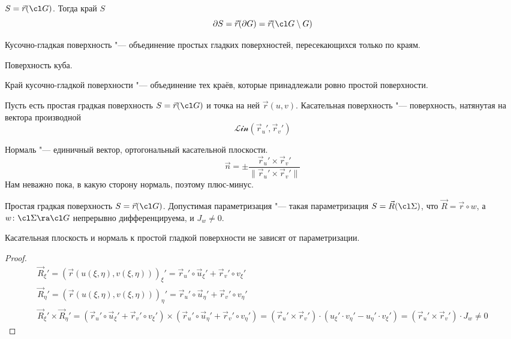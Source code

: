 \begin{Def}
	$S = \vec r(\cl G)$. Тогда край $S$
	\[ \partial S = \vec r(\partial G) = \vec r(\cl G \setminus G) \]
\end{Def}

\begin{Def}
	Кусочно-гладкая поверхность "--- объединение простых гладких поверхностей, пересекающихся только по краям.
\end{Def}

\begin{exmp}
	Поверхность куба.
\end{exmp}

\begin{Def}
	Край кусочно-гладкой поверхности "--- объединение тех краёв, которые принадлежали ровно простой поверхности.
\end{Def}

\begin{Def}
	Пусть есть простая градкая поверхность $S = \vec r(\cl G)$ и точка на ней $\vec r(u, v)$.
	Касательная поверхность "--- поверхность, натянутая на вектора производной
	\[ \mathcal{Lin}(\vec r_u', \vec r_v') \]
\end{Def}

\begin{Def}
	Нормаль "--- единичный вектор, ортогональный касательной плоскости.
	\[ \vec n = \pm\frac{\vec r_u' \times \vec r_v'}{\|\vec r_u' \times \vec r_v'\|} \]
	Нам неважно пока, в какую сторону нормаль, поэтому плюс-минус.
\end{Def}

\begin{Def}
	Простая градкая поверхность $S = \vec r(\cl G)$.
	Допустимая параметризация "--- такая параметризация $S = \vec R(\cl \Sigma)$,
	что $\vec R = \vec r \circ w$, а $w\colon \cl \Sigma \ra \cl G$ непрерывно дифференцируема, и $J_w \ne 0$.
\end{Def}

\begin{theorem}
	Касательная плоскость и нормаль к простой гладкой поверхности не зависят от параметризации.
\end{theorem}
\begin{proof}
	\begin{gather*}
		\vec R_\xi'
		= (\vec r(u(\xi,\eta),v(\xi,\eta)))_\xi'
		= \vec r_u' \circ \vec u_\xi'  + \vec r_v' \circ v_\xi'  \\
		\vec R_\eta'
		= (\vec r(u(\xi,\eta),v(\xi,\eta)))_\eta'
		= \vec r_u' \circ \vec u_\eta' + \vec r_v' \circ v_\eta' \\
		\vec R_\xi' \times \vec R_\eta'
		= (\vec r_u' \circ \vec u_\xi'  + \vec r_v' \circ v_\xi' ) \times (\vec r_u' \circ \vec u_\eta' + \vec r_v' \circ v_\eta')
		= (\vec r_u' \times \vec r_v') \cdot (u_\xi' \cdot v_\eta' - u_\eta' \cdot v_\xi')
		= (\vec r_u' \times \vec r_v') \cdot J_w \ne 0
	\end{gather*}
\end{proof}

